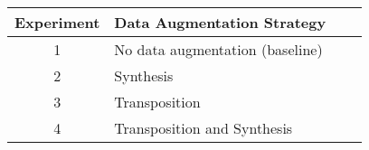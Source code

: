 \begin{tabular}{c|lll}
    Experiment & Data Augmentation Strategy \\ \hline
    1 & No data augmentation (baseline) \\
    2 & Synthesis \\
    3 & Transposition \\
    4 & Transposition and Synthesis \\
\end{tabular}
